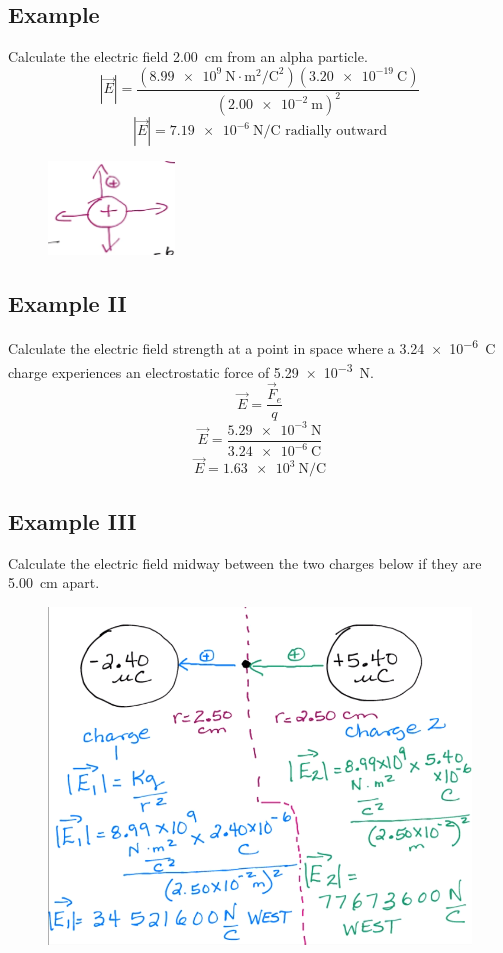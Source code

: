 \documentclass[a4paper,12pt]{article}
\begin{document}
\subsection{Example}
Calculate the electric field \SI{2.00}{\cm} from an alpha particle.
$$|\vec{E}| = \frac{(\SI{8.99e9}{\newton\cdot\m\squared\per\coulomb\squared})(\SI{3.20e-19}{\coulomb})}{(\SI{2.00e-2}{\m})^2}$$
$$|\vec{E}| = \SI{7.19e-6}{\newton\per\coulomb} \textrm{ radially outward}$$
\begin{figure}[H]
    \centering
    \includegraphics[width=0.3\textwidth]{fieldquestion}
\end{figure}

\subsection{Example II}
Calculate the electric field strength at a point in space where a \SI{3.24e-6}{\coulomb} charge experiences an electrostatic force of \SI{5.29e-3}{\newton}.
$$\vec{E} = \frac{\vec{F}_e}{q}$$
$$\vec{E} = \frac{\SI{5.29e-3}{\newton}}{\SI{3.24e-6}{\coulomb}}$$
$$\vec{E} = \SI{1.63e3}{\newton\per\coulomb}$$

\pagebreak
\subsection{Example III}
Calculate the electric field midway between the two charges below if they are \SI{5.00}{\cm} apart.
\begin{figure}[H]
    \centering
    \includegraphics[width=\textwidth]{fieldquestion3}
\end{figure}
\end{document}
